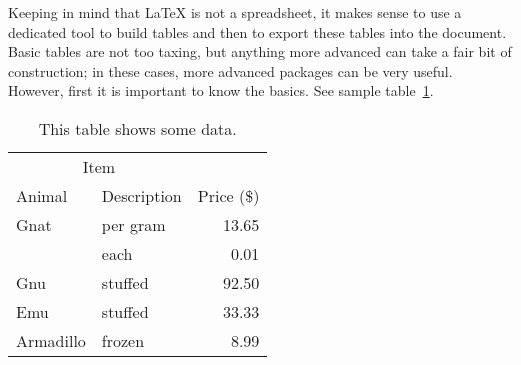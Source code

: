 Keeping in mind that LaTeX is not a spreadsheet, it makes sense to use a dedicated tool to build tables and then to export these tables into the document. Basic tables are not too taxing, but anything more advanced can take a fair bit of construction; in these cases, more advanced packages can be very useful. However, first it is important to know the basics. See sample table~\ref{tab:This table shows some data}.

\begin{table}
	\centering
	\caption{This table shows some data.}
	\label{tab:This table shows some data}
	\begin{tabular}{llr}
		\hline
		\multicolumn{2}{c}{Item} \\
		\cline{1-2}
		Animal    & Description & Price (\$) \\
		\hline
		Gnat      & per gram    & 13.65      \\
		& each        & 0.01       \\
		Gnu       & stuffed     & 92.50      \\
		Emu       & stuffed     & 33.33      \\
		Armadillo & frozen      & 8.99       \\
		\hline
	\end{tabular}
\end{table}
















